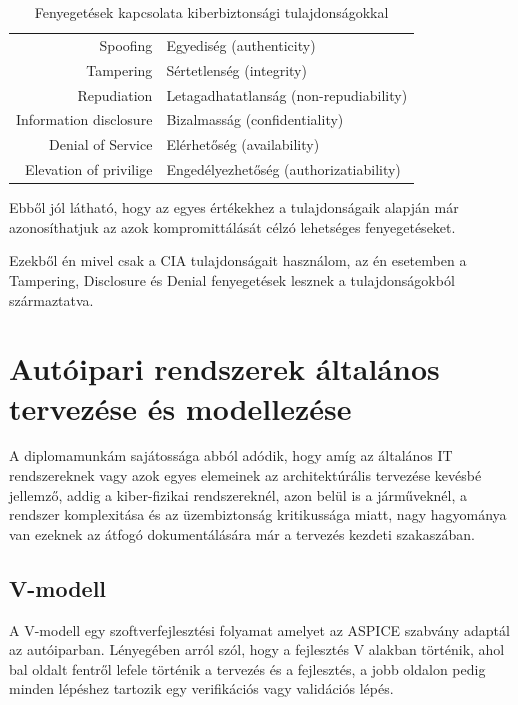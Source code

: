 \begin{table}[h]
    \centering
    \begin{tabular}{rl}
        Spoofing & Egyediség (authenticity) \\
        Tampering & Sértetlenség (integrity) \\
        Repudiation & Letagadhatatlanság (non-repudiability) \\
        Information disclosure & Bizalmasság (confidentiality) \\
        Denial of Service & Elérhetőség (availability) \\
        Elevation of privilige & Engedélyezhetőség (authorizatiability) \\
    \end{tabular}
    \caption{Fenyegetések kapcsolata kiberbiztonsági tulajdonságokkal}
    \label{tab:my_label}
\end{table}

Ebből jól látható, hogy az egyes értékekhez a tulajdonságaik alapján már azonosíthatjuk az azok kompromittálását célzó lehetséges fenyegetéseket.

Ezekből én mivel csak a CIA tulajdonságait használom, az én esetemben a Tampering, Disclosure és Denial fenyegetések lesznek a tulajdonságokból származtatva.

\section{Autóipari rendszerek általános tervezése és modellezése}

A diplomamunkám sajátossága abból adódik, hogy amíg az általános IT rendszereknek vagy azok egyes elemeinek az architektúrális tervezése kevésbé jellemző, addig a kiber-fizikai rendszereknél, azon belül is a járműveknél, a rendszer komplexitása és az üzembiztonság kritikussága miatt, nagy hagyománya van ezeknek az átfogó dokumentálására már a tervezés kezdeti szakaszában.

\subsection{V-modell}

A V-modell egy szoftverfejlesztési folyamat amelyet az ASPICE szabvány adaptál az autóiparban. Lényegében arról szól, hogy a fejlesztés V alakban történik, ahol bal oldalt fentről lefele történik a tervezés és a fejlesztés, a jobb oldalon pedig minden lépéshez tartozik egy verifikációs vagy validációs lépés.


